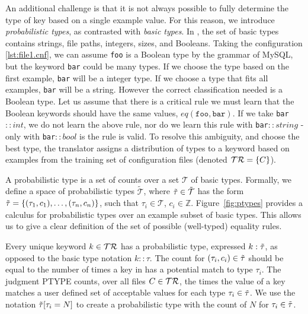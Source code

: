 An additional challenge is that it is not always possible to fully determine the type of key based on a single example value. 
For this reason, we introduce \textit{probabilistic types}, as contrasted with \textit{basic types}.
In \app, the set of basic types contains strings, file paths, integers, sizes, and Booleans. 
Taking the configuration \ref{lst:file1.cnf}, we can assume {\tt foo} is a Boolean type by the grammar of MySQL,
  but the keyword {\tt bar} could be many types.
If we choose the type based on the first example, {\tt bar} will be a integer type.
If we choose a type that fits all examples, {\tt bar} will be a string.
However the correct classification needed is a Boolean type.
Let us assume that there is a critical rule we must learn that the Boolean keywords should have the same values, $eq(\texttt{foo},\texttt{bar})$.
If we take {\tt bar}$::int$, we do not learn the above rule, nor do we learn this rule with {\tt bar}$::string$ - only with {\tt bar}$::bool$ is the rule is valid.
To resolve this ambiguity, and choose the best type, the translator assigns a distribution of types to a keyword based on examples from the training set of configuration files (denoted $\mathcal{TR}=\{C\}$).
 

A probabilistic type is a set of counts over a set $\mathcal{T}$ of basic types.
Formally, we define a space of probabilistic types $\tilde{\mathcal{T}}$, where $\tilde{\tau} \in \tilde{\mathcal{T}}$ has the form $\tilde{\tau}=\{(\tau_1, c_1),\ldots,(\tau_n, c_n)\}$, such that $\tau_i \in \mathcal{T}$, $c_i \in \mathbb{Z}$. 
Figure~\ref{fig:ptypes} provides a calculus for probabilistic types over an example subset of basic types.
This allows us to give a clear definition of the set of possible (\ie well-typed) equality rules.

Every unique keyword $k \in \mathcal{TR}$ has a probabilistic type, expressed $k:\tilde{\tau}$, as opposed to the basic type notation $k::\tau$.
The count for $(\tau_i,c_i) \in \tilde{\tau}$ should be equal to the number of times a key in \trainingSet has a potential match to type $\tau_i$.
The judgment {\scriptsize PTYPE} counts, over all files $C \in \mathcal{TR}$, the times the value of a key matches a user defined set of acceptable values for each type $\tau_i \in \tilde{\tau}$.
We use the notation $\tilde{\tau}[\tau_i=N]$ to create a probabilistic type with the count of $N$ for $\tau_i \in \tilde{\tau}$.

